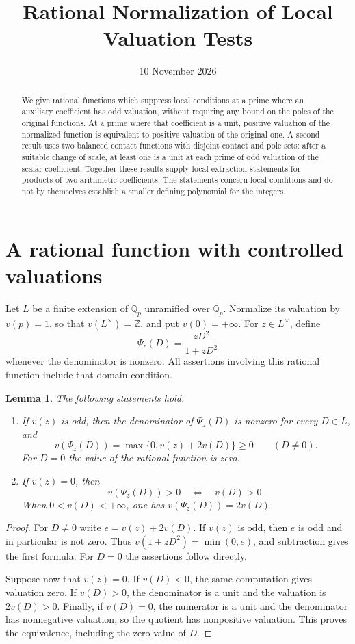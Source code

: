 \documentclass[11pt,a4paper]{article}
\title{Rational Normalization of Local Valuation Tests}
\author{}\date{10 November 2026}
\newtheorem{lemma}[theorem]{Lemma}
\newcommand{\Q}{\mathbb Q}
\begin{document}
\maketitle
\begin{abstract}
We give rational functions which suppress local conditions at a prime
where an auxiliary coefficient has odd valuation, without requiring any
bound on the poles of the original functions. At a prime where that
coefficient is a unit, positive valuation of the normalized function is
equivalent to positive valuation of the original one. A second result
uses two balanced contact functions with disjoint contact and pole sets:
after a suitable change of scale, at least one is a unit at each prime
of odd valuation of the scalar coefficient. Together these results
supply local extraction statements for products of two arithmetic
coefficients. The statements concern local conditions and do not by
themselves establish a smaller defining polynomial for the integers.
\end{abstract}

\section{A rational function with controlled valuations}

Let $L$ be a finite extension of $\Q_p$ unramified over $\Q_p$.
Normalize its valuation by $v(p)=1$, so that $v(L^\times)=\mathbb Z$,
and put $v(0)=+\infty$. For $z\in L^\times$, define
\[
                   \Psi_z(D)=\frac{zD^2}{1+zD^2}
\]
whenever the denominator is nonzero. All assertions involving this
rational function include that domain condition.

\begin{lemma}\label{lem:normalization}
The following statements hold.
\begin{enumerate}
\item If $v(z)$ is odd, then the denominator of $\Psi_z(D)$ is
nonzero for every $D\in L$, and
\[
 v(\Psi_z(D))=\max\{0,v(z)+2v(D)\}\ge0
 \qquad(D\ne0).
\]
For $D=0$ the value of the rational function is zero.
\item If $v(z)=0$, then
\[
        v(\Psi_z(D))>0\quad\Longleftrightarrow\quad v(D)>0.
\]
When $0<v(D)<+\infty$, one has
$v(\Psi_z(D))=2v(D)$.
\end{enumerate}
\end{lemma}
\begin{proof}
For $D\ne0$ write $e=v(z)+2v(D)$. If $v(z)$ is odd, then
$e$ is odd and in particular is not zero. Thus
$v(1+zD^2)=\min(0,e)$, and subtraction gives the first formula.
For $D=0$ the assertions follow directly.

Suppose now that $v(z)=0$. If $v(D)<0$, the same computation
gives valuation zero. If $v(D)>0$, the denominator is a unit and
the valuation is $2v(D)>0$. Finally, if $v(D)=0$, the numerator
is a unit and the denominator has nonnegative valuation, so the
quotient has nonpositive valuation. This proves the equivalence,
including the zero value of $D$.
\end{proof}
\end{document}
